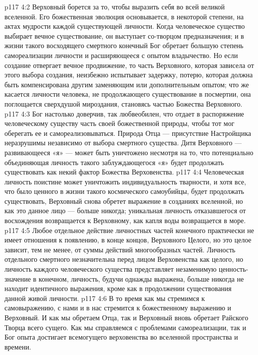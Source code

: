 \vs p117 4:2 Верховный борется за то, чтобы выразить себя во всей великой вселенной. Его божественная эволюция основывается, в некоторой степени, на актах мудрости каждой существующей личности. Когда человеческое существо выбирает вечное существование, он выступает со\hyp{}творцом предназначения; и в жизни такого восходящего смертного конечный Бог обретает большую степень самореализации личности и расширяющееся с опытом владычество. Но если создание отвергает вечное продвижение, то часть Верховного, которая зависела от этого выбора создания, неизбежно испытывает задержку, потерю, которая должна быть компенсирована другим заменяющим или дополнительным опытом; что же касается личности человека, не продолжающего существование в посмертии, она поглощается сверхдушой мироздания, становясь частью Божества Верховного.
\vs p117 4:3 Бог настолько доверчив, так любвеобилен, что отдает в распоряжение человеческому существу часть своей божественной природы, чтобы тот мог оберегать ее и самореализовываться. Природа Отца --- присутствие Настройщика неразрушимы независимо от выбора смертного существа. Дитя Верховного --- развивающееся «я» --- может быть уничтожено несмотря на то, что потенциально объединяющая личность такого заблуждающегося «я» будет продолжать существовать как некий фактор Божества Верховенства.
\vs p117 4:4 Человеческая личность поистине может уничтожить индивидуальность тварности, и хотя все, что было ценного в жизни такого космического самоубийцы, будет продолжать существовать,  Верховный снова обретет выражение в созданиях вселенной, но как это данное лицо --- больше никогда; уникальная личность отказавшегося от восхождения возвращается к Верховному, как капля воды возвращается в море.
\vs p117 4:5 Любое отдельное действие личностных частей конечного практически не имеет отношения к появлению, в конце концов, Верховного Целого, но это целое зависит, тем не менее, от суммы действий многообразных частей. Личность отдельного смертного незначительна перед лицом Верховенства как целого, но личность каждого человеческого существа представляет незаменимую ценность\hyp{}значение в конечном, личность, будучи однажды выражена, больше никогда не находит идентичного выражения, кроме как в продолжении существования данной живой личности.
\vs p117 4:6 В то время как мы стремимся к самовыражению, с нами и в нас стремится к божественному выражению и Верховный. И как мы обретаем Отца, так и Верховный вновь обретает Райского Творца всего сущего. Как мы справляемся с проблемами самореализации, так и Бог опыта достигает всемогущего верховенства во вселенной пространства и времени.
